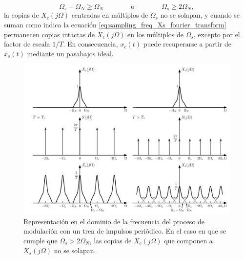 \documentclass[a4paper]{report}
\begin{document}
\[
 \Omega_s-\Omega_N\geq\Omega_N
 \qquad\qquad\textrm{o}\qquad\qquad
 \Omega_s\geq2\Omega_N,
\]
la copias de \(X_c(j\Omega)\) centradas en múltiplos de \(\Omega_s\) no se solapan, y cuando se suman como indica la ecuación \ref{eq:sampling_freq_Xs_fourier_transform} permanecen copias intactas de \(X_c(j\Omega)\) en los múltiplos de \(\Omega_s\), excepto por el factor de escala \(1/T\). En consecuencia, \(x_c(t)\) puede recuperarse a partir de \(x_s(t)\) mediante un pasabajos ideal.
\begin{figure}[!htb]
 \begin{center}
 \includegraphics[width=1\textwidth]{figuras/sampling_impulse_modulator_frequency_representation.pdf}
 \caption{\label{fig:sampling_impulse_modulator_frequency_representation} Representación en el dominio de la frecuencia del proceso de modulación con un tren de impulsos periódico. En el caso en que se cumple que \(\Omega_s>2\Omega_N\), las copias de \(X_c(j\Omega)\) que componen a \(X_s(j\Omega)\) no se solapan.}
 \end{center}
\end{figure}
\end{document}
